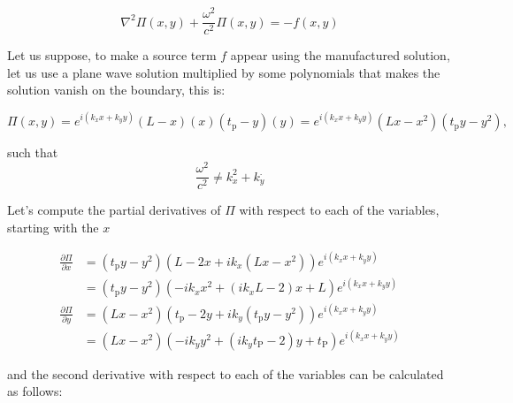 \documentclass{article}[a4paper, 12pt]
\begin{document}
\begin{equation}\label{helmholtz}
    \nabla^2\Pi(x,y) + \frac{\omega^2}{c^2}\Pi(x,y) = -f(x,y)
\end{equation}

Let us suppose, to make a source term $f$ appear using the manufactured solution, let us use a plane wave solution multiplied by some polynomials that makes the solution vanish on the boundary, this is:

\begin{equation}
    \Pi(x,y) = \displaystyle e^{i\left( k_xx + k_yy \right)}\left( L-x \right)\left( x \right)\left( t_{\mathrm{p}} -y\right)\left( y \right) =  \displaystyle e^{i\left( k_xx + k_yy \right)}\left( Lx-x^2 \right)\left( t_{\mathrm{p}}y -y^2\right),
\end{equation}

such that 
$$ \frac{\omega^2}{c^2}\neq k_x^2 + k_y^. $$

Let's compute the partial derivatives of $\Pi$ with respect to each of the variables, starting with the $x$

\begin{equation*}
    \begin{aligned}
        \frac{\partial\Pi}{\partial x} &= \left( t_{\mathrm{p}}y-y^2 \right)\left( L-2x + ik_x(Lx-x^2) \right)e^{i\left( k_xx + k_yy \right)}\\[1.5ex]
        & = \left( t_{\mathrm{p}}y-y^2 \right)\left( -ik_x x^2 + \left( ik_xL-2 \right)x + L\right)e^{i\left( k_xx + k_yy \right)} \\[2ex]   
        \frac{\partial\Pi}{\partial y} &= \left( Lx-x^2 \right)\left( t_{\mathrm{p}}-2y + ik_y(t_{\mathrm{p}}y-y^2) \right)e^{i\left( k_xx + k_yy \right)}\\[1.5ex]
        & = \left( Lx-x^2\right)\left( -ik_y y^2 + \left( ik_yt_{\mathrm{P}}-2 \right)y + t_{\mathrm{P}}\right)e^{i\left( k_xx + k_yy \right)} 
    \end{aligned}
\end{equation*}

and the second derivative with respect to each of the variables can be calculated as follows:
\end{document}
